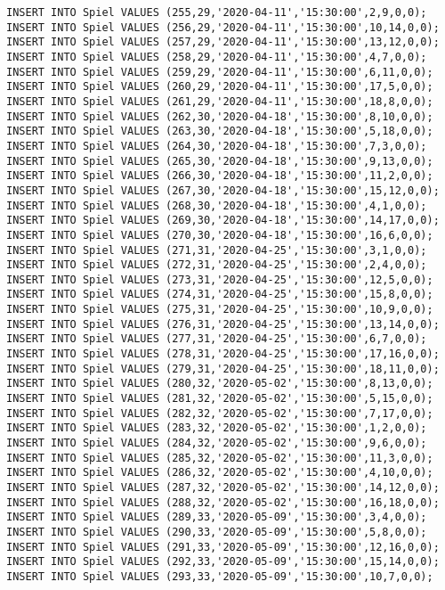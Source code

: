 \documentclass{lehramt-informatik-aufgabe}
\begin{document}
\begin{verbatim}
INSERT INTO Spiel VALUES (255,29,'2020-04-11','15:30:00',2,9,0,0);
INSERT INTO Spiel VALUES (256,29,'2020-04-11','15:30:00',10,14,0,0);
INSERT INTO Spiel VALUES (257,29,'2020-04-11','15:30:00',13,12,0,0);
INSERT INTO Spiel VALUES (258,29,'2020-04-11','15:30:00',4,7,0,0);
INSERT INTO Spiel VALUES (259,29,'2020-04-11','15:30:00',6,11,0,0);
INSERT INTO Spiel VALUES (260,29,'2020-04-11','15:30:00',17,5,0,0);
INSERT INTO Spiel VALUES (261,29,'2020-04-11','15:30:00',18,8,0,0);
INSERT INTO Spiel VALUES (262,30,'2020-04-18','15:30:00',8,10,0,0);
INSERT INTO Spiel VALUES (263,30,'2020-04-18','15:30:00',5,18,0,0);
INSERT INTO Spiel VALUES (264,30,'2020-04-18','15:30:00',7,3,0,0);
INSERT INTO Spiel VALUES (265,30,'2020-04-18','15:30:00',9,13,0,0);
INSERT INTO Spiel VALUES (266,30,'2020-04-18','15:30:00',11,2,0,0);
INSERT INTO Spiel VALUES (267,30,'2020-04-18','15:30:00',15,12,0,0);
INSERT INTO Spiel VALUES (268,30,'2020-04-18','15:30:00',4,1,0,0);
INSERT INTO Spiel VALUES (269,30,'2020-04-18','15:30:00',14,17,0,0);
INSERT INTO Spiel VALUES (270,30,'2020-04-18','15:30:00',16,6,0,0);
INSERT INTO Spiel VALUES (271,31,'2020-04-25','15:30:00',3,1,0,0);
INSERT INTO Spiel VALUES (272,31,'2020-04-25','15:30:00',2,4,0,0);
INSERT INTO Spiel VALUES (273,31,'2020-04-25','15:30:00',12,5,0,0);
INSERT INTO Spiel VALUES (274,31,'2020-04-25','15:30:00',15,8,0,0);
INSERT INTO Spiel VALUES (275,31,'2020-04-25','15:30:00',10,9,0,0);
INSERT INTO Spiel VALUES (276,31,'2020-04-25','15:30:00',13,14,0,0);
INSERT INTO Spiel VALUES (277,31,'2020-04-25','15:30:00',6,7,0,0);
INSERT INTO Spiel VALUES (278,31,'2020-04-25','15:30:00',17,16,0,0);
INSERT INTO Spiel VALUES (279,31,'2020-04-25','15:30:00',18,11,0,0);
INSERT INTO Spiel VALUES (280,32,'2020-05-02','15:30:00',8,13,0,0);
INSERT INTO Spiel VALUES (281,32,'2020-05-02','15:30:00',5,15,0,0);
INSERT INTO Spiel VALUES (282,32,'2020-05-02','15:30:00',7,17,0,0);
INSERT INTO Spiel VALUES (283,32,'2020-05-02','15:30:00',1,2,0,0);
INSERT INTO Spiel VALUES (284,32,'2020-05-02','15:30:00',9,6,0,0);
INSERT INTO Spiel VALUES (285,32,'2020-05-02','15:30:00',11,3,0,0);
INSERT INTO Spiel VALUES (286,32,'2020-05-02','15:30:00',4,10,0,0);
INSERT INTO Spiel VALUES (287,32,'2020-05-02','15:30:00',14,12,0,0);
INSERT INTO Spiel VALUES (288,32,'2020-05-02','15:30:00',16,18,0,0);
INSERT INTO Spiel VALUES (289,33,'2020-05-09','15:30:00',3,4,0,0);
INSERT INTO Spiel VALUES (290,33,'2020-05-09','15:30:00',5,8,0,0);
INSERT INTO Spiel VALUES (291,33,'2020-05-09','15:30:00',12,16,0,0);
INSERT INTO Spiel VALUES (292,33,'2020-05-09','15:30:00',15,14,0,0);
INSERT INTO Spiel VALUES (293,33,'2020-05-09','15:30:00',10,7,0,0);

\end{verbatim}
\end{document}
